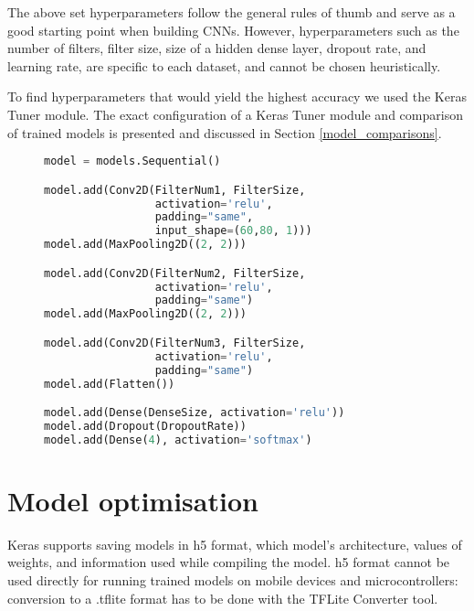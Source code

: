 The above set hyperparameters follow the general rules of thumb and serve as a good starting point when building CNNs\cite{cs231n}.
However, hyperparameters such as the number of filters, filter size, size of a hidden dense layer, dropout rate, and learning rate, are specific to each dataset, and cannot be chosen heuristically.

To find hyperparameters that would yield the highest accuracy we used the Keras Tuner module.
The exact configuration of a Keras Tuner module and comparison of trained models is presented and discussed in Section \ref{model_comparisons}.

\lstset{style=mystyle}
\begin{figure}[ht] 
\begin{lstlisting}[language=Python]
model = models.Sequential()

model.add(Conv2D(FilterNum1, FilterSize, 
                 activation='relu', 
                 padding="same", 
                 input_shape=(60,80, 1)))
model.add(MaxPooling2D((2, 2)))

model.add(Conv2D(FilterNum2, FilterSize, 
                 activation='relu', 
                 padding="same")
model.add(MaxPooling2D((2, 2)))

model.add(Conv2D(FilterNum3, FilterSize, 
                 activation='relu', 
                 padding="same")
model.add(Flatten())

model.add(Dense(DenseSize, activation='relu'))
model.add(Dropout(DropoutRate))
model.add(Dense(4), activation='softmax')
\end{lstlisting}
\label{model_code}
\end{figure}

\section{ Model optimisation}

Keras supports saving models in h5 format, which model's architecture, values of weights, and information used while compiling the model.
h5 format cannot be used directly for running trained models on mobile devices and microcontrollers: conversion to a .tflite format has to be done with the TFLite Converter tool.

